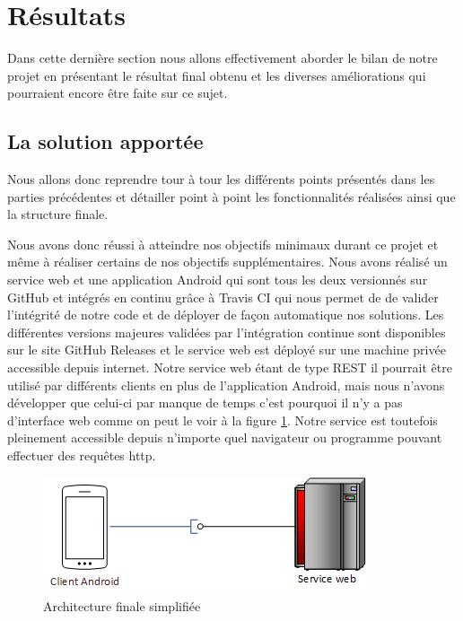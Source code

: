 \section{Résultats}

Dans cette dernière section nous allons effectivement aborder le bilan de notre projet en présentant le résultat final obtenu et les diverses améliorations qui pourraient encore être faite sur ce sujet.

\subsection{La solution apportée}

Nous allons donc reprendre tour à tour les différents points présentés dans les parties précédentes et détailler point à point les fonctionnalités réalisées ainsi que la structure finale.

Nous avons donc réussi à atteindre nos objectifs minimaux durant ce projet et même à réaliser certains de nos objectifs supplémentaires. Nous avons réalisé un service web et une application Android qui sont tous les deux versionnés sur GitHub et intégrés en continu grâce à Travis CI qui nous permet de de valider l’intégrité de notre code et de déployer de façon automatique nos solutions. Les différentes versions majeures validées par l’intégration continue sont disponibles sur le site GitHub Releases et le service web est déployé sur une machine privée accessible depuis internet. Notre service web étant de type REST il pourrait être utilisé par différents clients en plus de l’application Android, mais nous n’avons développer que celui-ci par manque de temps c’est pourquoi il n’y a pas d’interface web comme on peut le voir à la figure \ref{archifinale}. Notre service est toutefois pleinement accessible depuis n’importe quel navigateur ou programme pouvant effectuer des requêtes http.

\begin{figure}[H]
    \centering
    \includegraphics[width=\textwidth]{./img/archi_finale.png}
    \caption{Architecture finale simplifiée}
    \label{archifinale}
\end{figure}


